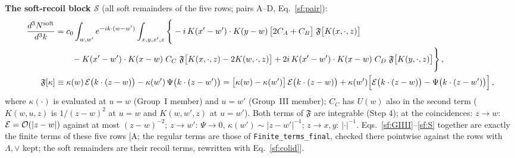 \documentclass[10pt]{article}
\begin{document}
\noindent\textbf{The soft-recoil block $\mathcal{S}$} (all soft remainders of the five rows; pairs A--D, Eq.~\eqref{sf:pair}):
\begin{align}
\frac{d^{3}N^{\rm soft}}{d^{3}k}&=c_{0}\int_{w,w'}e^{-ik\cdot(w-w')}\int_{x,y,x',z}\Bigg\{-i\,K(x'-w')\cdot K(y-w)\,\big[2C_{A}+C_{B}\big]\;\mathfrak{F}\big[K(x,\cdot,z)\big]\notag\\
&\qquad-K(x'-w')\cdot K(x-w)\;C_{C}\;\mathfrak{F}\big[K(x,\cdot,z)-2K(w,\cdot,z)\big]+2i\,K(x'-w')\cdot K(x-w)\;C_{D}\;\mathfrak{F}\big[K(y,\cdot,z)\big]\Bigg\}\,,\label{sf:S}\\
\mathfrak{F}[\kappa]&\equiv\kappa(w)\,\mathcal{E}\big(k\cdot(z-w)\big)-\kappa(w')\,\Psi\big(k\cdot(z-w')\big)=\big[\kappa(w)-\kappa(w')\big]\,\mathcal{E}\big(k\cdot(z-w)\big)+\kappa(w')\Big[\mathcal{E}\big(k\cdot(z-w)\big)-\Psi\big(k\cdot(z-w')\big)\Big]\,,\notag
\end{align}
where $\kappa(\cdot)$ is evaluated at $u=w$ (Group~I member) and $u=w'$ (Group~III member); $C_{C}$ has $U(w)$ also in the second term ($K(w,u,z)$ is $1/(z-w)^{2}$ at $u=w$ and $K(w,w',z)$ at $u=w'$). Both terms of $\mathfrak{F}$ are integrable (Step 4); at the coincidences: $z\to w$: $\mathcal{E}={\cal O}(|z-w|)$ against at most $(z-w)^{-2}$; $z\to w'$: $\Psi\to0$, $\kappa(w')\sim|z-w'|^{-1}$; $z\to x,y$: $|\cdot|^{-1}$. Eqs.~\eqref{sf:GIIII}--\eqref{sf:S} together are exactly the finite terms of these five rows [A; the regular terms are those of \texttt{Finite\_terms\_final}, checked there pointwise against the rows with $\Lambda,\vee$ kept; the soft remainders are their recoil terms, rewritten with Eq.~\eqref{sf:colid}].
\end{document}
